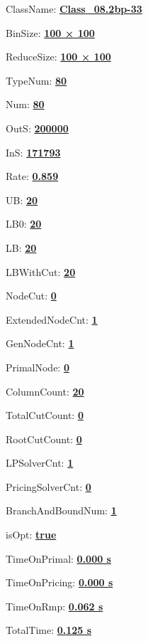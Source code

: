 \documentclass[11pt]{article}
\begin{document}
\pagestyle{empty}


ClassName: \underline{\textbf{Class_08.2bp-33}}
\par
BinSize: \underline{\textbf{100 × 100}}
\par
ReduceSize: \underline{\textbf{100 × 100}}
\par
TypeNum: \underline{\textbf{80}}
\par
Num: \underline{\textbf{80}}
\par
OutS: \underline{\textbf{200000}}
\par
InS: \underline{\textbf{171793}}
\par
Rate: \underline{\textbf{0.859}}
\par
UB: \underline{\textbf{20}}
\par
LB0: \underline{\textbf{20}}
\par
LB: \underline{\textbf{20}}
\par
LBWithCut: \underline{\textbf{20}}
\par
NodeCut: \underline{\textbf{0}}
\par
ExtendedNodeCnt: \underline{\textbf{1}}
\par
GenNodeCnt: \underline{\textbf{1}}
\par
PrimalNode: \underline{\textbf{0}}
\par
ColumnCount: \underline{\textbf{20}}
\par
TotalCutCount: \underline{\textbf{0}}
\par
RootCutCount: \underline{\textbf{0}}
\par
LPSolverCnt: \underline{\textbf{1}}
\par
PricingSolverCnt: \underline{\textbf{0}}
\par
BranchAndBoundNum: \underline{\textbf{1}}
\par
isOpt: \underline{\textbf{true}}
\par
TimeOnPrimal: \underline{\textbf{0.000 s}}
\par
TimeOnPricing: \underline{\textbf{0.000 s}}
\par
TimeOnRmp: \underline{\textbf{0.062 s}}
\par
TotalTime: \underline{\textbf{0.125 s}}
\par
\newpage


\end{document}
